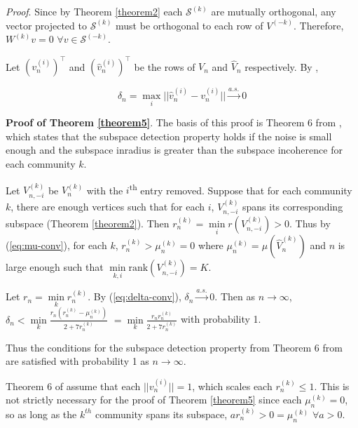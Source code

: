 \documentclass[
  12pt,
]{article}
\begin{document}
\emph{Proof}. Since by Theorem \ref{theorem2} each \(\mathcal{S}^{(k)}\)
are mutually orthogonal, any vector projected to \(\mathcal{S}^{(k)}\)
must be orthogonal to each row of \(V^{(-k)}\). Therefore,
\(W^{(k)} v = 0\) \(\forall v \in \mathcal{S}^{(-k)}\).

\begin{lemma}
\label{lemma3}
Let $(v_n^{(i)})^\top$ and $(\hat{v}_n^{(i)})^\top$ be the rows of $V_n$ and
$\hat{V}_n$ respectively. By \citeauthor{rubindelanchy2017statistical}, 

\begin{equation} \label{eq:delta-conv}
\delta_n = \max_i ||\hat{v}_n^{(i)} - v_n^{(i)}|| \stackrel{a.s.}{\to} 0
\end{equation}
\end{lemma}

\textbf{Proof of Theorem \ref{theorem5}}. The basis of this proof is
Theorem 6 from \citeauthor{jmlr-v28-wang13}, which states that the
subspace detection property holds if the noise is small enough and the
subspace inradius is greater than the subspace incoherence for each
community \(k\).

Let \(V_{n, -i}^{(k)}\) be \(V_n^{(k)}\) with the
\(i\)\textsuperscript{th} entry removed. Suppose that for each community
\(k\), there are enough vertices such that for each \(i\),
\(V_{n, -i}^{(k)}\) spans its corresponding subspace (Theorem
\ref{theorem2}). Then
\(r_n^{(k)} = \min\limits_i r(V_{n, -i}^{(k)}) > 0\). Thus by
(\ref{eq:mu-conv}), for each \(k\), \(r_n^{(k)} > \mu_n^{(k)} = 0\)
where \(\mu_n^{(k)} = \mu(\hat{V}_n^{(k)})\) and \(n\) is large enough
such that \(\min\limits_{k, i} \text{rank}(V_{n, -i}^{(k)}) = K\).

Let \(r_n = \min\limits_k r_n^{(k)}\). By (\ref{eq:delta-conv}),
\(\delta_n \stackrel{a.s.}{\to} 0\). Then as \(n\to \infty\),
\(\delta_n < \min\limits_k \frac{r_n (r_n^{(k)} - \mu_n^{(k)})}{2 + 7 r_n^{(k)}}\)
\(= \min\limits_k \frac{r_n r_n^{(k)}}{2 + 7 r_n^{(k)}}\) with
probability 1.

Thus the conditions for the subspace detection property from Theorem 6
from \citeauthor{jmlr-v28-wang13} are satisfied with probability 1 as
\(n \to \infty\).

\begin{remark}
Theorem 6 of \citeauthor{jmlr-v28-wang13} assume that each $||v_n^{(i)}|| = 1$, 
which scales each $r_n^{(k)} \leq 1$. This is not strictly necessary for 
the proof of Theorem \ref{theorem5} since each $\mu_n^{(k)} = 0$, so as long 
as the $k^{th}$ community spans its subspace, $a r_n^{(k)} > 0 = \mu_n^{(k)}$ 
$\forall a > 0$.
\end{remark}
\end{document}
